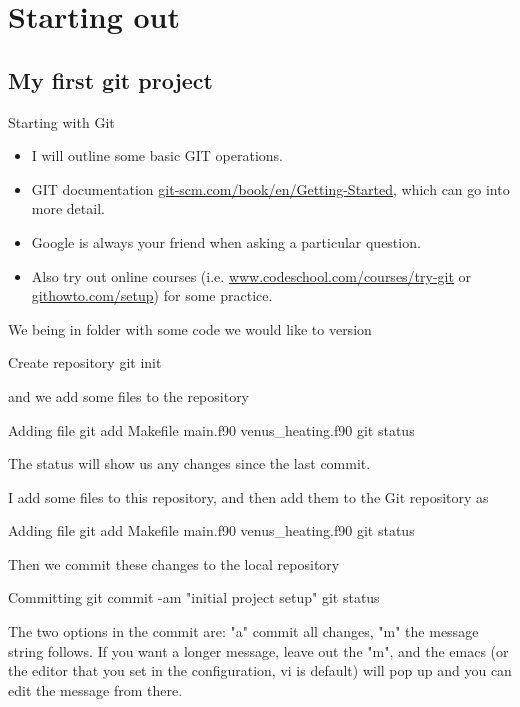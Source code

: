 \documentclass{beamer}
\begin{document}
%
%
%
%
%

\section{Starting out}

\subsection{My first git project}

\begin{frame}{Starting with Git}
\begin{itemize}
	\item I will outline some basic GIT operations.
	\item GIT documentation \url{git-scm.com/book/en/Getting-Started}, which can go into more detail. 
	\item Google is always your friend when asking a particular question.
	\item Also try out online courses (i.e. \url{www.codeschool.com/courses/try-git} or \url{githowto.com/setup}) for some practice.
\end{itemize}
\end{frame}


\begin{frame}
We being in folder with some code we would like to version
\begin{block}{Create repository}
git init
\end{block}
and we add some files to the repository
\begin{block}{Adding file}
git add Makefile main.f90 venus\_heating.f90 \newline
git status
\end{block}
The \alert{status} will show us any changes since the last \alert{commit}.
\end{frame}


\begin{frame}
I add some files to this repository, and then \alert{add} them to the Git repository as
\begin{block}{Adding file}
git add Makefile main.f90 venus\_heating.f90 \newline
git status
\end{block}
Then we \alert{commit} these changes to the local repository
\begin{block}{Committing}
git commit -am "initial project setup" \newline
git status
\end{block}
The two options in the commit are: "a" commit all changes, "m" the message string follows. If you want a longer message, leave out the "m", and the emacs (or the editor that you set in the configuration, vi is default) will pop up and you can edit the message from there.
\end{frame}
\end{document}

